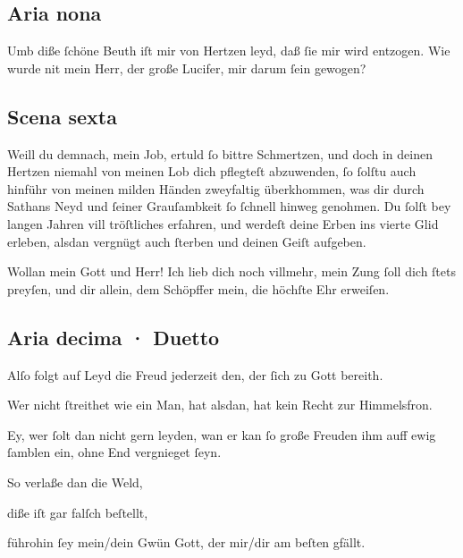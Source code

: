 \documentclass{ees}
\newenvironment{lyrics}[1]{%
  \subsection{#1}\nopagebreak%
  \begin{lyricslist}%
  \let\voice\item%
}{%
  \end{lyricslist}%
}
\begin{document}
\begin{lyrics}{Aria nona}
  \voice[Leviathan]
  Umb diße ſchöne Beuth
  iſt mir von Hertzen leyd,
  daß ſie mir wird entzogen.
  Wie wurde nit mein Herr,
  der große Lucifer,
  mir darum ſein gewogen?
\end{lyrics}

\begin{lyrics}{Scena sexta}
  \voice[Schöpffer]
  Weill du demnach, mein Job,
  ertuld ſo bittre Schmertzen,
  und doch in deinen Hertzen
  niemahl von meinen Lob
  dich pflegteſt abzuwenden,
  ſo ſolſtu auch hinführ
  von meinen milden Händen
  zweyfaltig überkhommen,
  was dir durch Sathans Neyd
  und ſeiner Grauſambkeit
  ſo ſchnell hinweg genohmen.
  Du ſolſt bey langen Jahren
  vill tröſtliches erfahren,
  und werdeſt deine Erben
  ins vierte Glid erleben,
  alsdan vergnügt auch ſterben
  und deinen Geiſt aufgeben.

  \voice[Job]
  Wollan mein Gott und Herr!
  Ich lieb dich noch villmehr,
  mein Zung ſoll dich ſtets preyſen,
  und dir allein,
  dem Schöpffer mein,
  die höchſte Ehr erweiſen.
\end{lyrics}

\begin{lyrics}{Aria decima · Duetto}
  \voice[Job]
  Alſo folgt auf Leyd die Freud
  jederzeit
  den, der ſich zu Gott bereith.

  \voice[Schöpffer]
  Wer nicht ſtreithet wie ein Man,
  hat alsdan,
  hat kein Recht zur Himmelsfron.

  \voice[beyde]
  Ey, wer ſolt dan nicht gern leyden,
  wan er kan ſo große Freuden
  ihm auff ewig ſamblen ein,
  ohne End vergnieget ſeyn.

  \voice[Schöpffer]
  So verlaße dan die Weld,

  \voice[Job]
  diße iſt gar falſch beſtellt,

  \voice[beyde]
  führohin
  ſey mein/dein Gwün
  Gott, der mir/dir am beſten gfällt.
\end{lyrics}

\end{document}
